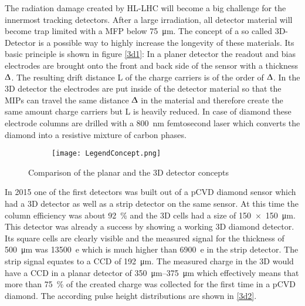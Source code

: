 The radiation damage created by \ac{HL-LHC} will become a big challenge for the innermost tracking detectors. After a large irradiation, all detector material will become trap limited with a \ac{MFP} below \SI{75}{\micro\meter}. The concept of a so called 3D-Detector is a possible way to highly increase the longevity of these materials. Its basic principle is shown in figure \vref{3d1}: In a planer detector the readout and bias electrodes are brought onto the front and back side of the sensor with a thickness $\Updelta$. The resulting drift distance L of the charge carriers is of the order of $\Updelta$. In the 3D detector the electrodes are put inside of the detector material so that the \acp{MIP} can travel the same distance $\Updelta$ in the material and therefore create the same amount charge carriers but L is heavily reduced. In case of diamond these electrode columns are drilled with a \SI{800}{\nano\meter} femtosecond laser which converts the diamond into a resistive mixture of carbon phases.\\

\begin{figure} 
	\centering
	\begin{subfigure}{0.1\textwidth}  
		\centering 
		\texttt{[image: LegendConcept.png]}
		\vspace*{19pt}
	\end{subfigure}
	\caption{Comparison of the planar and the 3D detector concepts}
	\label{3d1}
\end{figure}

\noindent In 2015 one of the first detectors was built out of a \ac{pCVD} diamond sensor which had a 3D detector as well as a strip detector on the same sensor. At this time the column efficiency was about \SI{92}{\%} and the 3D cells had a size of \SI{150x150}{\micro\meter}. This detector was already a success by showing a working 3D diamond detector. Its square cells are clearly visible and the measured signal for the thickness of \SI{500}{\micro\meter} was \SI{13500}{e} which is much higher than \SI{6900}{e} in the strip detector. The strip signal equates to a \ac{CCD} of \SI{192}{\micro\meter}. The measured charge in the 3D would have a \ac{CCD} in a planar detector of \SIrange{350}{375}{\micro\meter} which effectively means that more than \SI{75}{\%} of the created charge was collected for the first time in a \ac{pCVD} diamond. The according pulse height distributions are shown in \vref{3d2}.